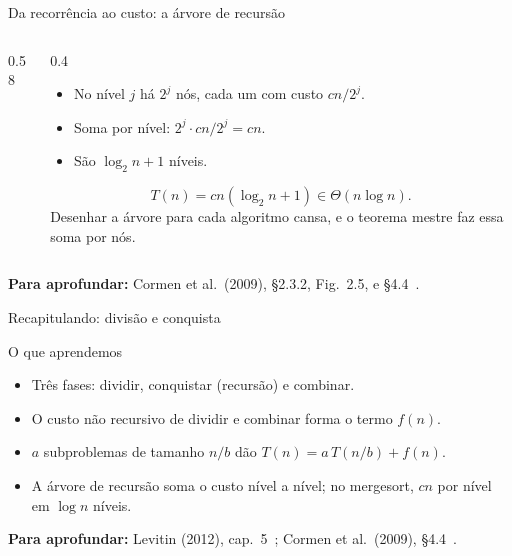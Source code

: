 \documentclass[aspectratio=169,xcolor=table]{beamer}
\newcommand{\fonte}[1]{%
  \vfill
  {\tiny\color{gray!55!black}\textbf{Para aprofundar:} #1\par}%
}
\begin{document}
\begin{frame}{Da recorrência ao custo: a árvore de recursão}
  \begin{columns}[c]
    \begin{column}{0.58\textwidth}
      \centering
    \end{column}
    \begin{column}{0.4\textwidth}
      \scriptsize
      \begin{itemize}\scriptsize
        \item No nível $j$ há $2^j$ nós, cada um com custo $cn/2^j$.
        \item Soma por nível: $2^j\cdot cn/2^j = cn$.
        \item São $\log_2 n+1$ níveis.
      \end{itemize}
      \[
        T(n)=cn(\log_2 n+1)\in\Theta(n\log n).
      \]
      Desenhar a árvore para cada algoritmo cansa, e o teorema mestre
      faz essa soma por nós.
    \end{column}
  \end{columns}
  \fonte{Cormen et al.\ (2009), \S 2.3.2, Fig.~2.5, e \S 4.4~\cite{cormen2009introduction}.}
\end{frame}

\begin{frame}{Recapitulando: divisão e conquista}
  \begin{block}{O que aprendemos}
    \begin{itemize}\small
      \item Três fases: dividir, conquistar (recursão) e combinar.
      \item O custo não recursivo de dividir e combinar forma o termo $f(n)$.
      \item $a$ subproblemas de tamanho $n/b$ dão $T(n)=a\,T(n/b)+f(n)$.
      \item A árvore de recursão soma o custo nível a nível; no mergesort,
            $cn$ por nível em $\log n$ níveis.
    \end{itemize}
  \end{block}
  \fonte{Levitin (2012), cap.~5~\cite{levitin2012introduction};
    Cormen et al.\ (2009), \S 4.4~\cite{cormen2009introduction}.}
\end{frame}
\end{document}
